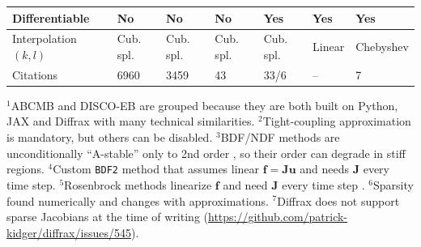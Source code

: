 \documentclass[USenglish, thumbmarks]{uiophdthesis} %
\begin{document}
\begin{table}[tb]
{\begin{tabular}{lllllll}
\midrule
Differentiable         & No                            & No                                 & No                              & Yes                                & Yes                                & Yes                  \\
\midrule
Interpolation $(k, l)$ & Cub. spl.                     & Cub. spl.                          & Cub. spl.                       & Cub. spl.                          & Linear                             & Chebyshev                  \\
\midrule
Citations              & 6960                          & 3459                               & 43                              & 33/6                               & --                                 & 7                \\
\bottomrule
\end{tabular}\par} %
\smallskip
\noindent\footnotesize
${}^1$ABCMB and DISCO-EB are grouped because they are both built on Python, JAX and Diffrax with many technical similarities.
${}^2$Tight-coupling approximation is mandatory, but others can be disabled. %
${}^3$BDF/NDF methods are unconditionally \enquote{A-stable} only to 2nd order \cite[section V.1]{hairerSolvingOrdinaryDifferential1996}, so their order can degrade in stiff regions.
${}^4$Custom \texttt{BDF2} method that assumes linear $\mathbf{f} = \mathbf{J} \mathbf{u}$ \cite{refregierPyCosmoIntegratedCosmological2018} and needs $\mathbf{J}$ every time step.
${}^5$Rosenbrock methods linearize $\mathbf{f}$ and need $\mathbf{J}$ every time step \cite{steinebachConstructionRosenbrockWanner2023}.
${}^6$Sparsity found numerically and changes with approximations.
${}^7$Diffrax does not support sparse Jacobians at the time of writing (\url{https://github.com/patrick-kidger/diffrax/issues/545}).
\end{table}
\end{document}
